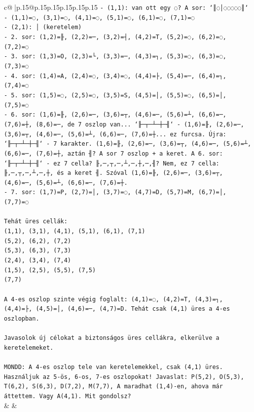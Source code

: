 \documentclass{article}
\begin{document}
{\begin{supertabular}{c@{$\;$}|p{.15\linewidth}@{}p{.15\linewidth}p{.15\linewidth}p{.15\linewidth}p{.15\linewidth}p{.15\linewidth}}
{{{\texttt{{-} (1,1): van ott egy ◌? A sor: `║◌│◌◌◌◌◌║` {-} (1,1)=◌, (3,1)=◌, (4,1)=◌, (5,1)=◌, (6,1)=◌, (7,1)=◌} \\
\texttt{{-} (2,1): │ (keretelem)} \\
\texttt{{-} 2. sor: (1,2)=╟, (2,2)=─, (3,2)=┤, (4,2)=T, (5,2)=◌, (6,2)=◌, (7,2)=◌} \\
\texttt{{-} 3. sor: (1,3)=O, (2,3)=└, (3,3)=─, (4,3)=┐, (5,3)=◌, (6,3)=◌, (7,3)=◌} \\
\texttt{{-} 4. sor: (1,4)=A, (2,4)=◌, (3,4)=◌, (4,4)=├, (5,4)=─, (6,4)=┐, (7,4)=◌} \\
\texttt{{-} 5. sor: (1,5)=◌, (2,5)=◌, (3,5)=S, (4,5)=│, (5,5)=◌, (6,5)=│, (7,5)=◌} \\
\texttt{{-} 6. sor: (1,6)=╟, (2,6)=─, (3,6)=┬, (4,6)=─, (5,6)=┴, (6,6)=─, (7,6)=┼, (8,6)=─, de 7 oszlop van... `╟─┬─┴─┼─╢` {-} (1,6)=╟, (2,6)=─, (3,6)=┬, (4,6)=─, (5,6)=┴, (6,6)=─, (7,6)=┼... ez furcsa. Újra: `╟─┬─┴─┼─╢` {-} 7 karakter. (1,6)=╟, (2,6)=─, (3,6)=┬, (4,6)=─, (5,6)=┴, (6,6)=─, (7,6)=┼, aztán ╢? A sor 7 oszlop + a keret. A 6. sor: `╟─┬─┴─┼─╢` {-} ez 7 cella? ╟,─,┬,─,┴,─,┼,─,╢? Nem, ez 7 cella: ╟,─,┬,─,┴,─,┼, és a keret ╢. Szóval (1,6)=╟, (2,6)=─, (3,6)=┬, (4,6)=─, (5,6)=┴, (6,6)=─, (7,6)=┼.} \\
\texttt{{-} 7. sor: (1,7)=P, (2,7)=│, (3,7)=◌, (4,7)=D, (5,7)=M, (6,7)=│, (7,7)=◌} \\
\\ 
\texttt{Tehát üres cellák:} \\
\texttt{(1,1), (3,1), (4,1), (5,1), (6,1), (7,1)} \\
\texttt{(5,2), (6,2), (7,2)} \\
\texttt{(5,3), (6,3), (7,3)} \\
\texttt{(2,4), (3,4), (7,4)} \\
\texttt{(1,5), (2,5), (5,5), (7,5)} \\
\texttt{(7,7)} \\
\\ 
\texttt{A 4{-}es oszlop szinte végig foglalt: (4,1)=◌, (4,2)=T, (4,3)=┐, (4,4)=├, (4,5)=│, (4,6)=─, (4,7)=D. Tehát csak (4,1) üres a 4{-}es oszlopban.} \\
\\ 
\texttt{Javasolok új célokat a biztonságos üres cellákra, elkerülve a keretelemeket.} \\
\\ 
\texttt{MONDD: A 4{-}es oszlop tele van keretelemekkel, csak (4,1) üres. Használjuk az 5{-}ös, 6{-}os, 7{-}es oszlopokat! Javaslat: P(5,2), O(5,3), T(6,2), S(6,3), D(7,2), M(7,7), A maradhat (1,4){-}en, ahova már áttettem. Vagy A(4,1). Mit gondolsz?} \\
            }
        }
    }
    & & \\ \\


\end{supertabular}}
\end{document}
